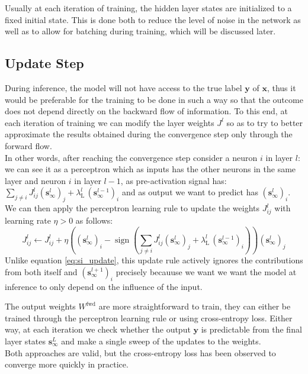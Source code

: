 \documentclass[a4paper,12pt]{report}
\begin{document}
Usually at each iteration of training, the hidden layer states are initialized to a 
fixed initial state. This is done both to reduce the level of noise in the network as
well as to allow for batching during training, which will be discussed later.

\subsection{Update Step}
During inference, the model will not have access to the true label $\mathbf{y}$ of 
$\mathbf{x}$, thus it would be preferable for the training to be done in such a way
so that the outcome does not depend directly on the backward flow of information.
To this end, at each iteration of training we can modify the layer weights $J^l$ 
so as to try to better approximate the results obtained during the convergence step
only through the forward flow. \\
In other words, after reaching the convergence step consider a neuron $i$ in layer 
$l$: we can see it as a perceptron which as inputs has the other neurons in the same 
layer and neuron $i$ in layer $l-1$, as pre-activation signal has: $\sum_{j \neq i} 
J_{ij}^l \left(\mathbf{s}^{l}_{\infty}\right)_j + \lambda_{\mathrm{L}}^l\, 
\left(\mathbf{s}^{l-1}_{\infty}\right)_i$ and as output we want to predict has 
$\left(\mathbf{s}^{l}_{\infty}\right)_i$. We can then apply the perceptron learning
rule to update the weights $J_{ij}^l$ with learning rate $\eta > 0$ as follows:
\begin{equation}
    J_{ij}^l \leftarrow J_{ij}^l + \eta \left(\left(\mathbf{s}^{l}_{\infty}\right)_i -
    \operatorname{sign}\left(\sum_{j \neq i} J_{ij}^l
    \left(\mathbf{s}^{l}_{\infty}\right)_j + \lambda_{\mathrm{L}}^l\,
    \left(\mathbf{s}^{l-1}_{\infty}\right)_i\right)\right)
    \left(\mathbf{s}^{l}_{\infty}\right)_j
\end{equation}
Unlike equation \ref{eq:si_update}, this update rule actively ignores the contributions
from both itself and $\left(\mathbf{s}^{l+1}_{\infty}\right)_i$ precisely becauuse we 
want we want the model at inference to only depend on the influence of the input.

The output weights $W^{\mathrm{fwd}}$ are more straightforward to train, they can 
either be trained through the perceptron learning rule or using cross-entropy loss. 
Either way, at each iteration we check whether the output $\mathbf{y}$ is predictable 
from the final layer states $\mathbf{s}^{L}_{\infty}$ and make a single sweep of the 
updates to the weights. \\
Both approaches are valid, but the cross-entropy loss has been observed to converge 
more quickly in practice.
\end{document}

